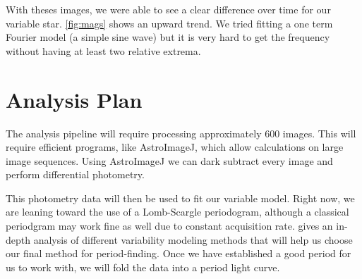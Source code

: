 \documentclass[]{article}
\begin{document}
	With theses images, we were able to see a clear difference over time for our variable star. \autoref{fig:mags} shows an upward trend. We tried fitting a one term Fourier model (a simple sine wave) but it is very hard to get the frequency without having at least two relative extrema.
	
\section{Analysis Plan}

	The analysis pipeline will require processing approximately 600 images. This will require efficient programs, like AstroImageJ, which allow calculations on large image sequences. Using AstroImageJ we can dark subtract every image and perform differential photometry. 
	
	This photometry data will then be used to fit our variable model. Right now, we are leaning toward the use of a Lomb-Scargle periodogram, although a classical periodgram may work fine as well due to constant acquisition rate. \textcite{2017arXiv170309824V} gives an in-depth analysis of different variability modeling methods that will help us choose our final method for period-finding. Once we have established a good period for us to work with, we will fold the data into a period light curve.
	



\printbibliography

\newpage
\appendix
\end{document}
